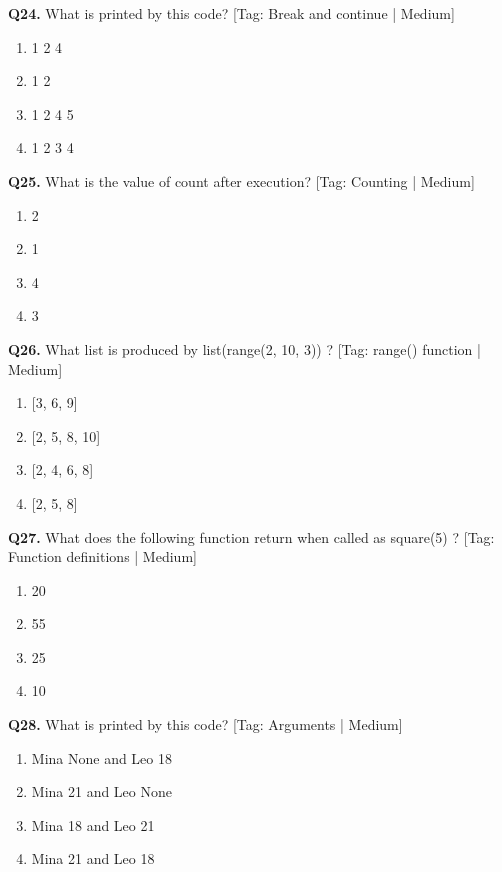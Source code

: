 \vspace{2mm}
\noindent\textbf{Q24.} What is printed by this code? \hfill [Tag: Break and continue | Medium]
\begin{enumerate}[label=(\alph*),topsep=2pt,itemsep=1pt,partopsep=0pt,parsep=0pt]
    \item {1 2 4}
    \item {1 2}
    \item {1 2 4 5}
    \item {1 2 3 4}
\end{enumerate}
\vspace{2mm}
\noindent\textbf{Q25.} What is the value of count after execution? \hfill [Tag: Counting | Medium]
\begin{enumerate}[label=(\alph*),topsep=2pt,itemsep=1pt,partopsep=0pt,parsep=0pt]
    \item {2}
    \item {1}
    \item {4}
    \item {3}
\end{enumerate}
\vspace{2mm}
\noindent\textbf{Q26.} What list is produced by list(range(2, 10, 3)) ? \hfill [Tag: range() function | Medium]
\begin{enumerate}[label=(\alph*),topsep=2pt,itemsep=1pt,partopsep=0pt,parsep=0pt]
    \item {[3, 6, 9]}
    \item {[2, 5, 8, 10]}
    \item {[2, 4, 6, 8]}
    \item {[2, 5, 8]}
\end{enumerate}
\vspace{2mm}
\noindent\textbf{Q27.} What does the following function return when called as square(5) ? \hfill [Tag: Function definitions | Medium]
\begin{enumerate}[label=(\alph*),topsep=2pt,itemsep=1pt,partopsep=0pt,parsep=0pt]
    \item {20}
    \item {55}
    \item {25}
    \item {10}
\end{enumerate}
\vspace{2mm}
\noindent\textbf{Q28.} What is printed by this code? \hfill [Tag: Arguments | Medium]
\begin{enumerate}[label=(\alph*),topsep=2pt,itemsep=1pt,partopsep=0pt,parsep=0pt]
    \item {Mina None and Leo 18}
    \item {Mina 21 and Leo None}
    \item {Mina 18 and Leo 21}
    \item {Mina 21 and Leo 18}
\end{enumerate}
